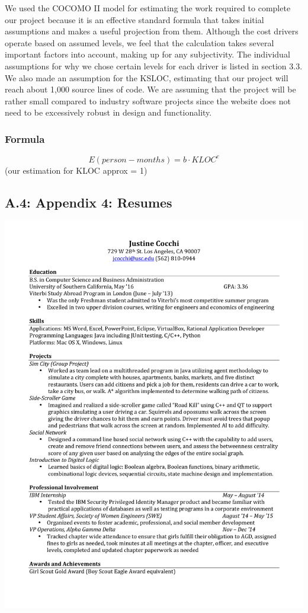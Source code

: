 \documentclass[]{article}
\begin{document}
We used the COCOMO II model for estimating the work required to complete
our project because it is an effective standard formula that takes
initial assumptions and makes a useful projection from them. Although
the cost drivers operate based on assumed levels, we feel that the
calculation takes several important factors into account, making up for
any subjectivity. The individual assumptions for why we chose certain
levels for each driver is listed in section 3.3. We also made an
assumption for the KSLOC, estimating that our project will reach about
1,000 source lines of code. We are assuming that the project will be
rather small compared to industry software projects since the website
does not need to be excessively robust in design and functionality.

\subsubsection{Formula}\label{formula}

\[
E(person-months) = b \cdot KLOC^c
\] (our estimation for KLOC approx = 1)

\subsection{A.4: Appendix 4: Resumes}\label{a.4-appendix-4-resumes}
\includegraphics{justine.pdf}
\pagebreak
\end{document}
